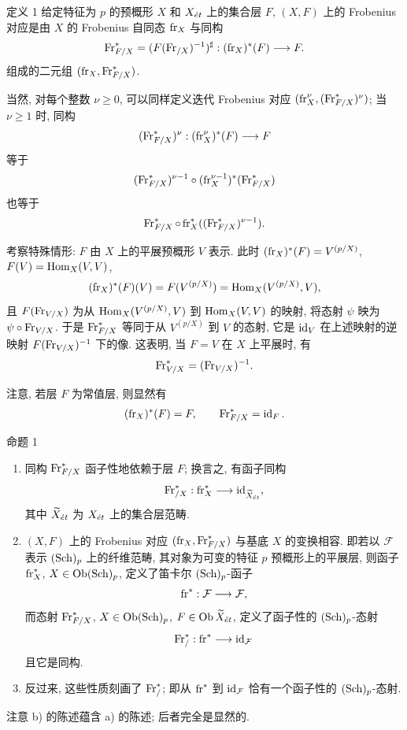 \begin{statement}{定义 1}
给定特征为 $p$ 的预概形 $X$ 和 $X_{\acute{e}t}$ 上的集合层 $F$, $(X,F)$ 上的 Frobenius 对应是由 $X$ 的 Frobenius 自同态 $\operatorname{fr}_X$ 与同构
\[
\operatorname{Fr}^*_{F/X}=(F(\operatorname{Fr}_{/X})^{-1})^\sharp:(\operatorname{fr}_X)^*(F)\longrightarrow F.
\]组成的二元组 $(\operatorname{fr}_X,\operatorname{Fr}^*_{F/X})$.
\end{statement}

当然, 对每个整数 $\nu\geq0$, 可以同样定义迭代 Frobenius 对应 $(\operatorname{fr}_X^\nu,(\operatorname{Fr}^*_{F/X})^\nu)$; 当 $\nu\geq1$ 时, 同构
\[
(\operatorname{Fr}^*_{F/X})^\nu:(\operatorname{fr}_X^\nu)^*(F)\longrightarrow F
\]
等于
\[
(\operatorname{Fr}^*_{F/X})^{\nu-1}\circ (\operatorname{fr}_X^{\nu-1})^*(\operatorname{Fr}^*_{F/X})
\]
也等于
\[
\operatorname{Fr}^*_{F/X}\circ\operatorname{fr}_X^*((\operatorname{Fr}^*_{F/X})^{\nu-1})
.\]


考察特殊情形: $F$ 由 $X$ 上的平展预概形 $V$ 表示. 此时 $(\operatorname{fr}_X)^*(F)=V^{(p/X)}$, $F(V)=\operatorname{Hom}_X(V,V)$,
\[
(\operatorname{fr}_X)^*(F)(V)=F(V^{(p/X)})=\operatorname{Hom}_X(V^{(p/X)},V),
\]
且 $F(\operatorname{Fr}_{V/X})$ 为从 $\operatorname{Hom}_X(V^{(p/X)},V)$ 到 $\operatorname{Hom}_X(V,V)$ 的映射, 将态射 $\psi$ 映为 $\psi\circ\operatorname{Fr}_{V/X}$. 于是 $\operatorname{Fr}^*_{F/X}$ 等同于从 $V^{(p/X)}$ 到 $V$ 的态射, 它是 $\operatorname{id}_V$ 在上述映射的逆映射 $F(\operatorname{Fr}_{V/X})^{-1}$ 下的像. 这表明, 当 $F=V$ 在 $X$ 上平展时, 有
\[
\operatorname{Fr}^*_{V/X}=(\operatorname{Fr}_{V/X})^{-1}.
\]

注意, 若层 $F$ 为常值层, 则显然有
\[
(\operatorname{fr}_X)^*(F)=F,
\qquad
\operatorname{Fr}^*_{F/X}=\operatorname{id}_F.
\]

\begin{statement}{命题 1}
\begin{enumerate}[label=\alph*)]
\item 同构 $\operatorname{Fr}^*_{F/X}$ 函子性地依赖于层 $F$; 换言之, 有函子同构
\[
\operatorname{Fr}^*_{/X}:\operatorname{fr}_X^*\longrightarrow \operatorname{id}_{\widetilde X_{\acute{e}t}},
\]
其中 $\widetilde X_{\acute{e}t}$ 为 $X_{\acute{e}t}$ 上的集合层范畴.
\item $(X,F)$ 上的 Frobenius 对应 $(\operatorname{fr}_X,\operatorname{Fr}^*_{F/X})$ 与基底 $X$ 的变换相容. 即若以 $\mathcal F$ 表示 $(\operatorname{Sch})_p$ 上的纤维范畴, 其对象为可变的特征 $p$ 预概形上的平展层, 则函子 $\operatorname{fr}_X^*$, $X\in\operatorname{Ob}(\operatorname{Sch})_p$, 定义了笛卡尔 $(\operatorname{Sch})_p$-函子
\[
\operatorname{fr}^*: \mathcal F\longrightarrow\mathcal F,
\]
而态射 $\operatorname{Fr}^*_{F/X}$, $X\in\operatorname{Ob}(\operatorname{Sch})_p$, $F\in\operatorname{Ob}\widetilde X_{\acute{e}t}$, 定义了函子性的 $(\operatorname{Sch})_p$-态射
\[
\operatorname{Fr}^*_{/}:\operatorname{fr}^*\longrightarrow\operatorname{id}_{\mathcal F}
\]
且它是同构.
\item 反过来, 这些性质刻画了 $\operatorname{Fr}^*_{/}$; 即从 $\operatorname{fr}^*$ 到 $\operatorname{id}_{\mathcal F}$ 恰有一个函子性的 $(\operatorname{Sch})_p$-态射.
\end{enumerate}
\end{statement}

注意 b) 的陈述蕴含 a) 的陈述; 后者完全是显然的.

